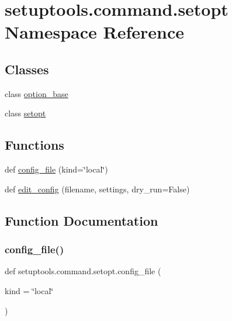 \hypertarget{namespacesetuptools_1_1command_1_1setopt}{}\section{setuptools.\+command.\+setopt Namespace Reference}
\label{namespacesetuptools_1_1command_1_1setopt}
\subsection*{Classes}
\begin{DoxyCompactItemize}
\item 
class \hyperlink{classsetuptools_1_1command_1_1setopt_1_1option__base}{option\+\_\+base}
\item 
class \hyperlink{classsetuptools_1_1command_1_1setopt_1_1setopt}{setopt}
\end{DoxyCompactItemize}
\subsection*{Functions}
\begin{DoxyCompactItemize}
\item 
def \hyperlink{namespacesetuptools_1_1command_1_1setopt_ad752b37cad3757f6b9457e752a74f87a}{config\+\_\+file} (kind=\char`\"{}local\char`\"{})
\item 
def \hyperlink{namespacesetuptools_1_1command_1_1setopt_aea3f5581fe84f5821452ac30e78dd66a}{edit\+\_\+config} (filename, settings, dry\+\_\+run=False)
\end{DoxyCompactItemize}


\subsection{Function Documentation}
\mbox{\label{namespacesetuptools_1_1command_1_1setopt_ad752b37cad3757f6b9457e752a74f87a}} 
\subsubsection{\texorpdfstring{config\+\_\+file()}{config\_file()}}
{\footnotesize\ttfamily def setuptools.\+command.\+setopt.\+config\+\_\+file (\begin{DoxyParamCaption}\item[{}]{kind = {\ttfamily \char`\"{}local\char`\"{}} }\end{DoxyParamCaption})}

